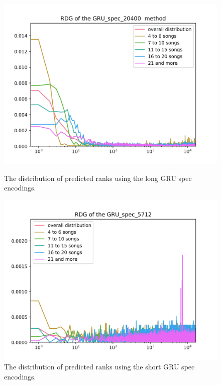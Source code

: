 \begin{figure}[h]
\centering
\begin{minipage}{.5\textwidth}
  \centering
  \includegraphics[width=1\linewidth]{./img/gru_spec_20400_graph.png}
  \caption{The distribution of predicted ranks using the long GRU spec encodings.}
  \label{fig:gru_spec_20400_distribution}
\end{minipage}%
\begin{minipage}{.5\textwidth}
  \centering
  \includegraphics[width=1\linewidth]{./img/gru_spec_5712_graph.png}
  \caption{The distribution of predicted ranks using the short GRU spec encodings.}
  \label{fig:gru_spec_5712_distribution}
\end{minipage}
\end{figure}\label{fig:gru_spec_distributions}

